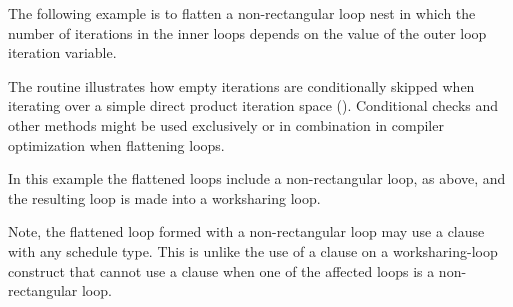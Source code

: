 The following example is to flatten a non-rectangular loop nest in which 
the number of iterations in the inner loops depends on the value of 
the outer loop iteration variable.

The  routine illustrates
how empty iterations are conditionally skipped when iterating
over a simple direct product iteration space ().
Conditional checks and other methods 
might be used exclusively or in combination in compiler 
optimization when flattening loops.



In this example the flattened loops include a non-rectangular loop, as 
above, and the resulting loop is made into a worksharing loop.

Note, the flattened loop formed with a non-rectangular loop may use a 
 clause with any schedule type.  This is unlike the 
use of a  clause on a worksharing-loop construct that cannot 
use a  clause when one of the affected loops is a 
non-rectangular loop.

